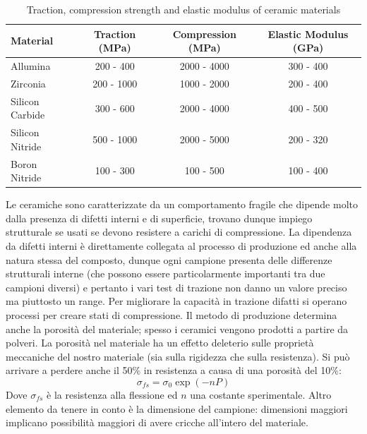 \begin{table}[h]
\centering
\begin{tabular}{lccc}
\hline
\textbf{Material}     & \textbf{Traction (MPa)} & \textbf{Compression (MPa)} & \textbf{Elastic Modulus (GPa)} \\ \hline
Allumina               & 200 - 400                          & 2000 - 4000                          & 300 - 400                       \\ \hline
Zirconia              & 200 - 1000                         & 1000 - 2000                          & 200 - 400                       \\ \hline
Silicon Carbide       & 300 - 600                          & 2000 - 4000                          & 400 - 500                       \\ \hline
Silicon Nitride       & 500 - 1000                         & 2000 - 5000                          & 200 - 320                       \\ \hline
Boron Nitride         & 100 - 300                          & 100 - 500                            & 100 - 400                       \\ \hline
\end{tabular}
\caption{Traction, compression strength and elastic modulus of ceramic materials}
\label{tab:ceramic_properties}
\end{table}

Le ceramiche sono caratterizzate da un comportamento fragile che dipende molto dalla presenza di difetti interni e di superficie, trovano dunque impiego strutturale se usati se devono resistere a carichi di compressione. La dipendenza da difetti interni è direttamente collegata al processo di produzione ed anche alla natura stessa del composto, dunque ogni campione presenta delle differenze strutturali interne (che possono essere particolarmente importanti tra due campioni diversi) e pertanto i vari test di trazione non danno un valore preciso ma piuttosto un range. Per migliorare la capacità in trazione difatti si operano processi per creare stati di compressione.
Il metodo di produzione determina anche la porosità del materiale; spesso i ceramici vengono prodotti a partire da polveri. La porosità nel materiale ha un effetto deleterio sulle proprietà meccaniche del nostro materiale (sia sulla rigidezza che sulla resistenza). Si può arrivare a perdere anche il 50\% in resistenza a causa di una porosità del 10\%:
\begin{equation}
    \sigma_{fs}=\sigma_0\exp(-nP)
\end{equation}
Dove $\sigma_{fs}$ è la resistenza alla flessione ed $n$ una costante sperimentale. Altro elemento da tenere in conto è la dimensione del campione: dimensioni maggiori implicano possibilità maggiori di avere cricche all'intero del materiale.

